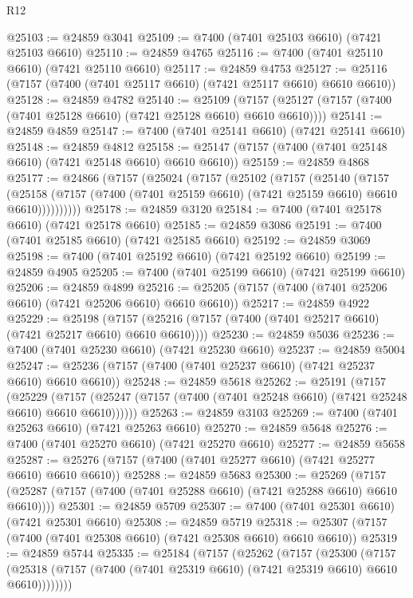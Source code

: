 \begin{lexlean}{R12}
\begin{coremodule}
@25103 := @24859 @3041
@25109 := @7400 (@7401 @25103 @6610) (@7421 @25103 @6610)
@25110 := @24859 @4765
@25116 := @7400 (@7401 @25110 @6610) (@7421 @25110 @6610)
@25117 := @24859 @4753
@25127 := @25116 (@7157 (@7400 (@7401 @25117 @6610) (@7421 @25117 @6610) @6610 @6610))
@25128 := @24859 @4782
@25140 := @25109
    (@7157 (@25127 (@7157 (@7400 (@7401 @25128 @6610) (@7421 @25128 @6610) @6610 @6610))))
@25141 := @24859 @4859
@25147 := @7400 (@7401 @25141 @6610) (@7421 @25141 @6610)
@25148 := @24859 @4812
@25158 := @25147 (@7157 (@7400 (@7401 @25148 @6610) (@7421 @25148 @6610) @6610 @6610))
@25159 := @24859 @4868
@25177 := @24866
    (@7157
      (@25024
        (@7157
          (@25102
            (@7157
              (@25140
                (@7157
                  (@25158
                    (@7157 (@7400 (@7401 @25159 @6610) (@7421 @25159 @6610) @6610 @6610))))))))))
@25178 := @24859 @3120
@25184 := @7400 (@7401 @25178 @6610) (@7421 @25178 @6610)
@25185 := @24859 @3086
@25191 := @7400 (@7401 @25185 @6610) (@7421 @25185 @6610)
@25192 := @24859 @3069
@25198 := @7400 (@7401 @25192 @6610) (@7421 @25192 @6610)
@25199 := @24859 @4905
@25205 := @7400 (@7401 @25199 @6610) (@7421 @25199 @6610)
@25206 := @24859 @4899
@25216 := @25205 (@7157 (@7400 (@7401 @25206 @6610) (@7421 @25206 @6610) @6610 @6610))
@25217 := @24859 @4922
@25229 := @25198
    (@7157 (@25216 (@7157 (@7400 (@7401 @25217 @6610) (@7421 @25217 @6610) @6610 @6610))))
@25230 := @24859 @5036
@25236 := @7400 (@7401 @25230 @6610) (@7421 @25230 @6610)
@25237 := @24859 @5004
@25247 := @25236 (@7157 (@7400 (@7401 @25237 @6610) (@7421 @25237 @6610) @6610 @6610))
@25248 := @24859 @5618
@25262 := @25191
    (@7157
      (@25229
        (@7157 (@25247 (@7157 (@7400 (@7401 @25248 @6610) (@7421 @25248 @6610) @6610 @6610))))))
@25263 := @24859 @3103
@25269 := @7400 (@7401 @25263 @6610) (@7421 @25263 @6610)
@25270 := @24859 @5648
@25276 := @7400 (@7401 @25270 @6610) (@7421 @25270 @6610)
@25277 := @24859 @5658
@25287 := @25276 (@7157 (@7400 (@7401 @25277 @6610) (@7421 @25277 @6610) @6610 @6610))
@25288 := @24859 @5683
@25300 := @25269
    (@7157 (@25287 (@7157 (@7400 (@7401 @25288 @6610) (@7421 @25288 @6610) @6610 @6610))))
@25301 := @24859 @5709
@25307 := @7400 (@7401 @25301 @6610) (@7421 @25301 @6610)
@25308 := @24859 @5719
@25318 := @25307 (@7157 (@7400 (@7401 @25308 @6610) (@7421 @25308 @6610) @6610 @6610))
@25319 := @24859 @5744
@25335 := @25184
    (@7157
      (@25262
        (@7157
          (@25300
            (@7157
              (@25318 (@7157 (@7400 (@7401 @25319 @6610) (@7421 @25319 @6610) @6610 @6610))))))))

\end{coremodule}
\end{lexlean}
